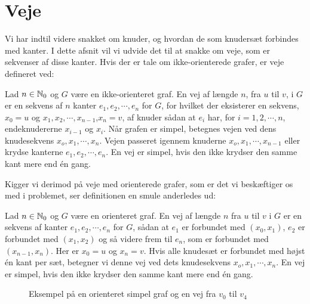 \section{Veje}
Vi har indtil videre snakket om knuder, og hvordan de som knudersæt forbindes med kanter. I dette afsnit vil vi udvide det til at snakke om veje, som er sekvenser af disse kanter. Hvis der er tale om ikke-orienterede grafer, er veje defineret ved:
\begin{defn}
[Veje] 
Lad $n \in \mathbb{N} _0$  og $G$ være en ikke-orienteret graf. En vej af længde $n$, fra $u$ til $v$, i $G$ er en sekvens af $n$ kanter $e_{1},e_{2},\cdots,e_{n}$ for $G$, for hvilket der eksisterer en sekvens, $x_{0}=u$ og $x_{1},x_{2},\cdots,x_{n-1}$,$x_{n}=v$, af knuder sådan at $e_{i}$ har, for $i=1,2,\cdots,n$, endeknudererne $x_{i-1}$ og $x_{i}$. Når grafen er simpel, betegnes vejen ved dens knudesekvens $x_{o},x_{1},\cdots,x_{n}$. Vejen passeret igennem knuderne $x_{o},x_{1},\cdots,x_{n-1}$ eller krydse kanterne $e_{1},e_{2},\cdots,e_{n}$. En vej er simpel, hvis den ikke krydser den samme kant mere end én gang.
\end{defn}
Kigger vi derimod på veje med orienterede grafer, som er det vi beskæftiger os med i problemet, ser definitionen en smule anderledes ud:
\begin{defn}
[Veje] 
Lad $n \in \mathbb{N} _0$ og $G$ være en orienteret graf. En vej af længde $n$ fra $u$ til $v$ i $G$ er en sekvens af kanter $e_{1},e_{2},\cdots,e_{n}$ for $G$, sådan at $e_{1}$ er forbundet med $(x_{0},x_{1})$, $e_{2}$ er forbundet med $(x_{1},x_{2})$ og så videre frem til $e_{n}$, som er forbundet med $(x_{n-1},x_{n})$. Her er $x_{0}=u$ og $x_{n}=v$. Hvis alle knudesæt er forbundet med højst én kant per sæt, betegner vi denne  vej ved dets knudesekvens $x_{o},x_{1},\cdots,x_{n}$. En vej er simpel, hvis den ikke krydser den samme kant mere end én gang.
\end{defn}

\begin{figure}[H]
\centering
	\caption{Eksempel på en orienteret simpel graf og en vej fra $v_{0}$ til $v_{4}$}
	\label{fig.vaegtetopg}
\end{figure}


